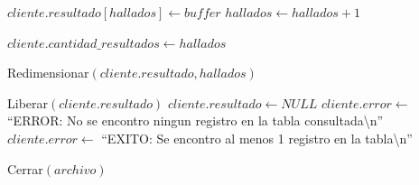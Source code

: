 \begin{tcolorbox}[colback=white, colframe=azul_unam, 
title=Pseudocódigo: consulta.c, breakable]
\begin{algorithmic}[1]
    \State $cliente.resultado[hallados] \gets buffer$
    \State $hallados \gets hallados + 1$

\EndWhile

\State $cliente.cantidad\_resultados \gets hallados$

    \State Redimensionar$(cliente.resultado, hallados)$
\EndIf

    \State Liberar$(cliente.resultado)$
    \State $cliente.resultado \gets NULL$
    \State $cliente.error \gets$ ``ERROR: No se encontro ningun registro en la tabla consultada\textbackslash n''
\Else
    \State $cliente.error \gets$ ``EXITO: Se encontro al menos 1 registro en la tabla\textbackslash n''
\EndIf

\State Cerrar$(archivo)$

\EndProcedure

\end{algorithmic}
\end{tcolorbox}

